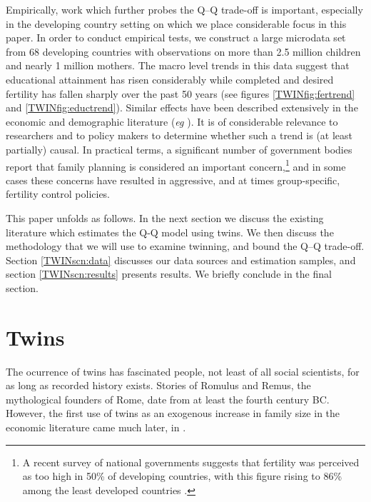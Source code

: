 \documentclass[subeqn]{article}
\begin{document}
\begin{spacing}{1.4}
Empirically, work which further probes the Q--Q trade-off is important,
especially in the developing country setting on which we place considerable 
focus in this paper. In order to conduct empirical tests, we construct a large 
microdata set from 68 developing countries with observations on more than 2.5 
million children and nearly 1 million mothers. The macro level trends in this 
data suggest that educational attainment has risen considerably while completed 
and desired fertility has fallen sharply over the past 50 years (see figures 
\ref{TWINfig:fertrend} and \ref{TWINfig:eductrend}). Similar effects have been 
described extensively in the economic and demographic literature (\emph{eg} 
\citet{Hanushek1992}). It is of considerable relevance to researchers and to 
policy makers to determine whether such a trend is (at least partially) causal.
In practical terms, a significant number of government bodies report that
family planning is considered an important concern,\footnote{A recent survey of 
national governments suggests that fertility was perceived as too high in 50\% 
of developing countries, with this figure rising to 86\% among the least 
developed countries \citet{UN2010}.}  and in some cases these concerns have 
resulted in aggressive, and at times group-specific, fertility control 
policies.

This paper unfolds as follows. In the next section we discuss the existing 
literature which estimates the Q-Q model using twins. We then discuss the 
methodology that we will use to examine twinning, and bound the Q--Q trade-off.
Section \ref{TWINscn:data} discusses our data sources and estimation samples, 
and section \ref{TWINscn:results} presents results. We briefly conclude in the 
final section.

\section{Twins}                                    \label{TWINscn:literature}
The ocurrence of twins has fascinated people, not least of all social 
scientists, for as long as recorded history exists. Stories of Romulus and 
Remus, the mythological founders of Rome, date from at least the fourth century 
BC. However, the first use of twins as an exogenous increase in family size in 
the economic literature came much later, in \citet{RosenzweigWolpin1980}.


\end{spacing}
\end{document}
